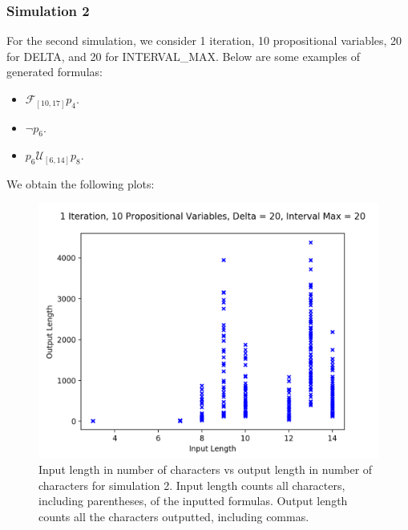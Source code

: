 \documentclass[runningheads]{llncs}
\begin{document}
\subsubsection{Simulation 2}
For the second simulation, we consider 1 iteration, 10 propositional variables, 20 for DELTA, and 20 for INTERVAL\_MAX. Below are some examples of generated formulas:
\begin{itemize}
    \item $\mathcal{F}_{[10,17]} p_4$.
    \item $\neg p_6$.
    \item $p_6 \mathcal{U}_{[6,14]} p_8$.
\end{itemize}
We obtain the following plots:
\begin{figure}[H]
    \centering
    \includegraphics[scale=0.75]{images/Sim2Length.png}
    \caption{Input length in number of characters vs output length in number of characters for simulation 2. Input length counts all characters, including parentheses, of the inputted formulas. Output length counts all the characters outputted, including commas.}
\end{figure}
\end{document}
